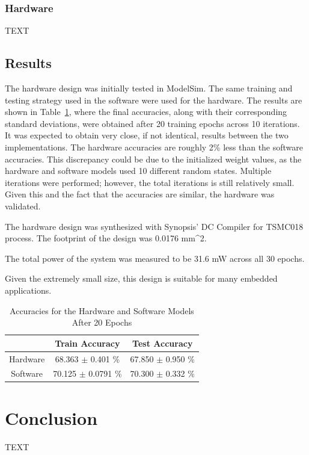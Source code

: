 \documentclass[10pt,journal]{IEEEtran}
\newcommand{\tbl}[1]{Table~\ref{#1}}
\begin{document}
		\subsubsection{Hardware}
			TEXT
	
	\subsection{Results}
		The hardware design was initially tested in ModelSim. The same training and testing strategy used in the software were used for the hardware. The results are shown in \tbl{table:accuracy_results}, where the final accuracies, along with their corresponding standard deviations, were obtained after 20 training epochs across 10 iterations. It was expected to obtain very close, if not identical, results between the two implementations. The hardware accuracies are roughly 2\% less than the software accuracies. This discrepancy could be due to the initialized weight values, as the hardware and software models used 10 different random states. Multiple iterations were performed; however, the total iterations is still relatively small. Given this and the fact that the accuracies are similar, the hardware was validated.
		
		The hardware design was synthesized with Synopsis' DC Compiler for TSMC018 process. The footprint of the design was 0.0176 mm^2.
		
		The total power of the system was measured to be 31.6 mW across all 30 epochs.
		
		Given the extremely small size, this design is suitable for many embedded applications.
		
		
		
		\begin{table}[!t]
			\renewcommand{\arraystretch}{1.3}
			\caption{Accuracies for the Hardware and Software Models After 20 Epochs}
			\label{table:accuracy_results}
			\centering
			\begin{tabular}{ccc}
				\hline
				         & Train Accuracy           & Test Accuracy           \\
				\hline
				Hardware & 68.363 \(\pm\) 0.401  \% & 67.850 \(\pm\) 0.950 \% \\
				Software & 70.125 \(\pm\) 0.0791 \% & 70.300 \(\pm\) 0.332 \% \\
				\hline
			\end{tabular}
		\end{table}		
	
	\section{Conclusion}
		TEXT
	
	
		
	
\end{document}
